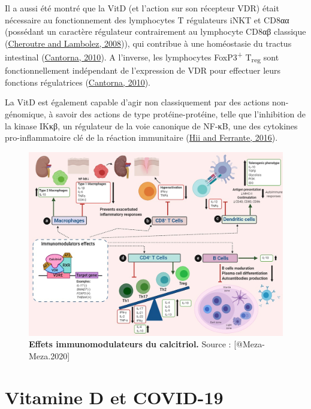 \documentclass[
  letterpaper,
  DIV=11,
  numbers=noendperiod]{scrartcl}
\begin{document}
Il a aussi été montré que la VitD (et l'action sur son récepteur VDR)
était nécessaire au fonctionnement des lymphocytes T régulateurs iNKT et
CD8αα (possédant un caractère régulateur contrairement au lymphocyte
CD8αβ classique (\protect\hyperlink{ref-Cheroutre.2008}{Cheroutre and
Lambolez, 2008})), qui contribue à une homéostasie du tractus intestinal
(\protect\hyperlink{ref-Cantorna.2010}{Cantorna, 2010}). A l'inverse,
les lymphocytes FoxP3\textsuperscript{+} T\textsubscript{reg} sont
fonctionnellement indépendant de l'expression de VDR pour effectuer
leurs fonctions régulatrices
(\protect\hyperlink{ref-Cantorna.2010}{Cantorna, 2010}).

La VitD est également capable d'agir non classiquement par des actions
non-génomique, à savoir des actions de type protéine-protéine, telle que
l'inhibition de la kinase IKκβ, un régulateur de la voie canonique de
NF-κB, une des cytokines pro-inflammatoire clé de la réaction
immunitaire (\protect\hyperlink{ref-Hii.2016}{Hii and Ferrante, 2016}).

\begin{figure}
\includegraphics{figures/calcitriol-immunomodulatory.jpg} 
\caption[\textbf{Effets immunomodulateurs du calcitriol.}]{\textbf{Effets immunomodulateurs du calcitriol.} Source : [@Meza-Meza.2020]}\label{fig:immunomod}
\end{figure}

\hypertarget{vitamine-d-et-covid-19}{%
\section{Vitamine D et COVID-19}\label{vitamine-d-et-covid-19}}
\end{document}
